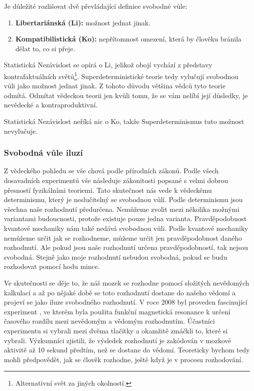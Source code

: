 Je důležité rozlišovat dvě převládající definice svobodné vůle:
\begin{enumerate}
    \item \textbf{Libertariánská (Li):} možnost jednat jinak.
    \item \textbf{Kompatibilistická (Ko):} nepřítomnost omezení, která by člověku bránila dělat to, co si přeje.
\end{enumerate}

Statistická Nezávislost se opírá o Li, jelikož obojí vychází z představy kontrafaktuálních světů\footnote[13]{Alternativní svět za jiných okolností.}. Superdeterministické teorie tedy vylučují svobodnou vůli jako možnost jednat jinak. Z tohoto důvodu většina vědců tyto teorie odmítá. Odmítat vědeckou teorii jen kvůli tomu, že se vám nelíbí její důsledky, je nevědecké a kontraproduktivní.

Statistická Nezávislost neříká nic o Ko, takže Superdeterminismus tuto možnost nevylučuje.

\subsubsection{Svobodná vůle iluzí}
Z vědeckého pohledu se vše chová podle přírodních zákonů. Podle všech dosavadních experimentů vše následuje zákonitosti popsané s velmi dobrou přesností fyzikálními teoriemi. Tato skutečnost nás vede k vědeckému determinismu, který je neslučitelný se svobodnou vůlí. Podle determinismu jsou všechna naše rozhodnutí předurčena. Nemůžeme zvolit mezi několika možnými variantami budoucnosti, protože existuje pouze jedna varianta. Pravděpodobnost kvantové mechaniky nám také nedává svobodnou vůli. Podle kvantové mechaniky nemůžeme určit jak se rozhodneme, můžeme určit jen pravděpodobnost daného rozhodnutí. Ale pokud jsou naše rozhodnutí určena pravděpodobností, tak nejsou svobodná. Stejně jako moje rozhodnutí nebudou svobodná, pokud se budu rozhodovat pomocí hodu mince.

Ve skutečnosti se děje to, že náš mozek se rozhodne pomocí složitých nevědomých kalkulací a až po nějaké době se toto rozhodnutí dostane do našeho vědomí a projeví se jako iluze svobodného rozhodnutí. V roce 2008 byl proveden fascinující experiment \parencite{DecisionDet}, ve kterém byla použita funkční magnetická resonance k určení časového rozdílu mezi nevědomým a vědomým rozhodnutím. Účastníci experimentu si vybrali mezi dvěma tlačítky a okamžitě zmáčkli to, které si vybrali. Výzkumníci zjistili, že výsledek rozhodnutí je zakódován v mozkové aktivitě až 10 sekund předtím, než se dostane do vědomí. Teoreticky bychom tedy mohli předpovědět, jak se člověk rozhodne, ještě když je v procesu rozhodování.

